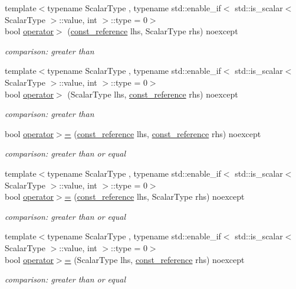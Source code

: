 \begin{DoxyCompactItemize}
{\footnotesize template$<$typename Scalar\+Type , typename std\+::enable\+\_\+if$<$ std\+::is\+\_\+scalar$<$ Scalar\+Type $>$\+::value, int $>$\+::type  = 0$>$ }\\bool \hyperlink{classnlohmann_1_1basic__json_a9ea8e0e86820fcb3ab0fc937d41226e7}{operator$>$} (\hyperlink{classnlohmann_1_1basic__json_ab8a1c33ee7b154fc41ca2545aa9724e6}{const\+\_\+reference} lhs, Scalar\+Type rhs) noexcept
\begin{DoxyCompactList}\small\item\em comparison\+: greater than \end{DoxyCompactList}\item 
{\footnotesize template$<$typename Scalar\+Type , typename std\+::enable\+\_\+if$<$ std\+::is\+\_\+scalar$<$ Scalar\+Type $>$\+::value, int $>$\+::type  = 0$>$ }\\bool \hyperlink{classnlohmann_1_1basic__json_a67771044f08fd07105b34667615d9e0e}{operator$>$} (Scalar\+Type lhs, \hyperlink{classnlohmann_1_1basic__json_ab8a1c33ee7b154fc41ca2545aa9724e6}{const\+\_\+reference} rhs) noexcept
\begin{DoxyCompactList}\small\item\em comparison\+: greater than \end{DoxyCompactList}\item 
bool \hyperlink{classnlohmann_1_1basic__json_a74a943800c7f103d0990d7eef82c6453}{operator$>$=} (\hyperlink{classnlohmann_1_1basic__json_ab8a1c33ee7b154fc41ca2545aa9724e6}{const\+\_\+reference} lhs, \hyperlink{classnlohmann_1_1basic__json_ab8a1c33ee7b154fc41ca2545aa9724e6}{const\+\_\+reference} rhs) noexcept
\begin{DoxyCompactList}\small\item\em comparison\+: greater than or equal \end{DoxyCompactList}\item 
{\footnotesize template$<$typename Scalar\+Type , typename std\+::enable\+\_\+if$<$ std\+::is\+\_\+scalar$<$ Scalar\+Type $>$\+::value, int $>$\+::type  = 0$>$ }\\bool \hyperlink{classnlohmann_1_1basic__json_ab83d11de4db25633f93e067aa218cae9}{operator$>$=} (\hyperlink{classnlohmann_1_1basic__json_ab8a1c33ee7b154fc41ca2545aa9724e6}{const\+\_\+reference} lhs, Scalar\+Type rhs) noexcept
\begin{DoxyCompactList}\small\item\em comparison\+: greater than or equal \end{DoxyCompactList}\item 
{\footnotesize template$<$typename Scalar\+Type , typename std\+::enable\+\_\+if$<$ std\+::is\+\_\+scalar$<$ Scalar\+Type $>$\+::value, int $>$\+::type  = 0$>$ }\\bool \hyperlink{classnlohmann_1_1basic__json_a94c61e0128f0794e7a34e1aecee5c445}{operator$>$=} (Scalar\+Type lhs, \hyperlink{classnlohmann_1_1basic__json_ab8a1c33ee7b154fc41ca2545aa9724e6}{const\+\_\+reference} rhs) noexcept
\begin{DoxyCompactList}\small\item\em comparison\+: greater than or equal \end{DoxyCompactList}\end{DoxyCompactItemize}

